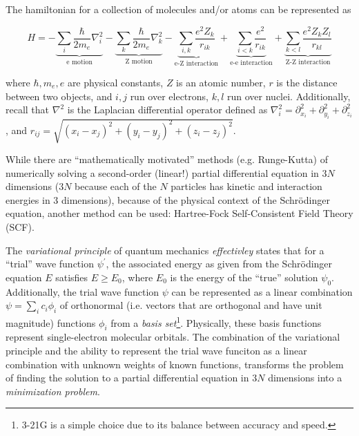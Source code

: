\documentclass{report}
\begin{document}
            The hamiltonian for a collection of molecules and/or atoms can be represented as\cite{cramer2013essentials}

            \begin{equation}
                H = -\underbrace{\sum_i \frac{\hbar}{2 m_e} \nabla_i^2}_{\text{e motion}} - \underbrace{\sum_k \frac{\hbar}{2 m_e} \nabla_k^2}_{\text{Z motion}} - \underbrace{\sum_{i,k} \frac{e^2 Z_k}{r_{ik}}}_{\text{e-Z interaction}} + \underbrace{\sum_{i < k} \frac{e^2}{r_{ik}}}_{\text{e-e interaction}} + \underbrace{\sum_{k < l} \frac{e^2 Z_k Z_l}{r_{kl}}}_{\text{Z-Z interaction}}
            \end{equation}

            where $\hbar, m_e, e$ are physical constants, $Z$ is an atomic number, $r$ is the distance between two objects, and $i,j$ run over electrons, $k,l$ run over nuclei.  Additionally, recall that $\nabla^2$ is the Laplacian differential operator defined as $\nabla_i^2 = \partial_{x_i}^2 + \partial_{y_i}^2 + \partial_{z_i}^2$, and $r_{ij} = \sqrt{(x_i - x_j)^2 + (y_i - y_j)^2 + (z_i - z_j)^2}$.

            While there are ``mathematically motivated'' methods (e.g. Runge-Kutta) of numerically solving a second-order (linear!) partial differential equation in $3N$ dimensions ($3N$ because each of the $N$ particles has kinetic and interaction energies in 3 dimensions), because of the physical context of the Schr{\"o}dinger equation, another method can be used: Hartree-Fock Self-Consistent Field Theory (SCF).

            The \emph{variational principle} of quantum mechanics \textit{effectivley} states that for a ``trial'' wave function $\psi^\prime$, the associated energy as given from the Schr{\"o}dinger equation $E$ satisfies $E \geq E_0$, where $E_0$ is the energy of the ``true'' solution $\psi_0$.  Additionally, the trial wave function $\psi$ can be represented as a linear combination $\psi = \sum_i c_i \phi_i$ of orthonormal (i.e. vectors that are orthogonal and have unit magnitude) functions $\phi_i$ from a \emph{basis set}\footnote{3-21G is a simple choice due to its balance between accuracy and speed\cite{cramer2013essentials}.}.  Physically, these basis functions represent single-electron molecular orbitals.  The combination of the variational principle and the ability to represent the trial wave funciton as a linear combination with unknown weights of known functions, transforms the problem of finding the solution to a partial differential equation in $3N$ dimensions into a \emph{minimization problem}.
\end{document}
